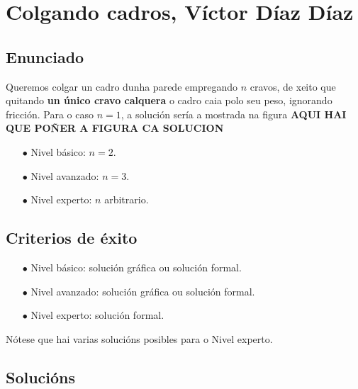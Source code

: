 
\section*{\textcolor{Resalte}{Colgando cadros}, Víctor Díaz Díaz
}

%

\begin{refsection}
\begin{multicols}{2}

\subsection*{Enunciado}

Queremos colgar un cadro dunha parede empregando $n$ cravos, de xeito que
quitando \textbf{un único cravo calquera} o cadro caia polo seu peso, ignorando
fricción. Para o caso $n=1$, a solución sería a mostrada na figura \textbf{AQUI
HAI QUE POÑER A FIGURA CA SOLUCION}

\begin{itemize}
    \item[$\bullet$] Nivel básico: $n=2$.
    \item[$\bullet$] Nivel avanzado: $n=3$.
    \item[$\bullet$] Nivel experto: $n$ arbitrario.
\end{itemize}


\subsection*{Criterios de éxito}

\begin{itemize}
    \item[$\bullet$] Nivel básico: solución gráfica ou solución formal.
    \item[$\bullet$] Nivel avanzado: solución gráfica ou solución formal.
    \item[$\bullet$] Nivel experto: solución formal.
\end{itemize}

Nótese que hai varias solucións posibles para o Nivel experto.

\subsection*{Solucións}


\end{multicols}
\end{refsection}
